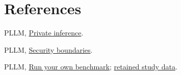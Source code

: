 \documentclass[10pt,letterpaper]{article}
\begin{document}
\begin{minipage}[t]{.485\textwidth}
\section*{References}
\fontsize{7.2}{8.5}\selectfont
[1] PLLM, \href{https://pllm.run/understand/architecture/}{Private inference}.\par
[2] PLLM, \href{https://pllm.run/understand/privacy-assurance/}{Security boundaries}.\par
[3] PLLM, \href{https://pllm.run/measure/reproduce/}{Run your own benchmark}; \href{https://pllm.run/downloads/current-runtime-2026-09-11.json}{retained study data}.

\end{minipage}
\end{document}
